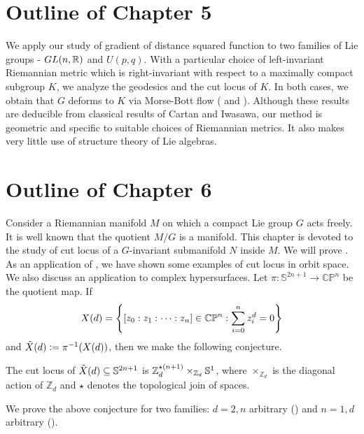 \section{Outline of Chapter 5}
\hfb We apply our study of gradient of distance squared function to two families of Lie groups - $GL(n,\mathbb{R})$ and $U(p,q)$. With a particular choice of left-invariant Riemannian metric which is right-invariant with respect to a maximally compact subgroup $K$, we analyze the geodesics and the cut locus of $K$. In both cases, we obtain that $G$ deforms to $K$ via Morse-Bott flow ( and ). Although these results are deducible from classical results of Cartan and Iwasawa, our method is geometric and specific to suitable choices of Riemannian metrics. It also makes very little use of structure theory of Lie algebras. 

\section{Outline of Chapter 6}
\hfb Consider a Riemannian manifold $M$ on which a compact Lie group $G$ acts freely. It is well known that the quotient $M/G$ is a manifold. This chapter is devoted to the study of cut locus of a $G$-invariant submanifold $N$ inside $M$. We will prove . As an application of , we have shown some examples of cut locus in orbit space. We also discuss an application to complex hypersurfaces. Let $\pi:\mathbb{S}^{2n+1}\to \mathbb{CP}^n$ be the quotient map. If 
\begin{displaymath}
    X(d)=\Bigg\{[z_0:z_1:\cdots:z_n]\in \mathbb{CP}^n:\sum_{i=0}^n z_i^d=0\Bigg\}\index{$X(d)$}
\end{displaymath}
and $\tilde{X}(d)\vcentcolon= \pi^{-1}(X(d))$, then we make the following conjecture. 
\begin{conj}\label{thm:cut-locus-of_X(d)}
	The cut locus of $\tilde{X}(d)\subseteq \mathbb{S}^{2n+1}$ is $\mathbb{Z}_d^{\star(n+1)}\times_{\mathbb{Z}_d}\mathbb{S}^1$, where $\times_{\mathbb{Z}_d}$ is the diagonal action of $\mathbb{Z}_d$ and $\star$ denotes the topological join of spaces.  
\end{conj}

\vspace{0.3cm}
\noindent We prove the above conjecture for two families:  $d=2, n$ arbitrary () and $n=1, d$ arbitrary (). 